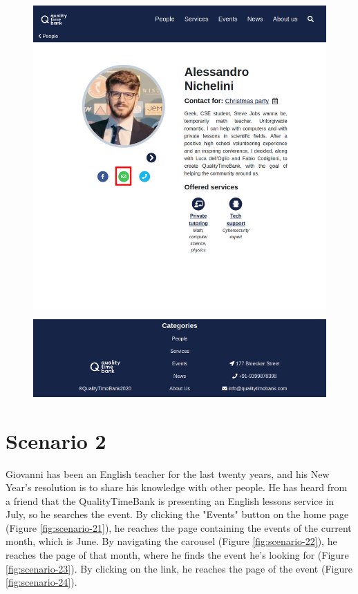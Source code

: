 \documentclass[a4paper, 11pt, parskip=half, headsepline]{scrreprt}
\begin{document}
\begin{figure}[H]
\begin{minipage}[t]{0.5\textwidth}
    	\includegraphics[width=1\linewidth, keepaspectratio]{scenarios/scenario-14}
    	\caption{}
    	\label{fig:scenario-14}
    \end{minipage}
\end{figure}

\section{Scenario 2}	

Giovanni has been an English teacher for the last twenty years, and his New Year's resolution is to share his knowledge with other people. He has heard from a friend that the QualityTimeBank is presenting an English lessons service in July, so he searches the event. By clicking the "Events" button on the home page (Figure \ref{fig:scenario-21}), he reaches the page containing the events of the current month, which is June. By navigating the carousel (Figure \ref{fig:scenario-22}), he reaches the page of that month, where he finds the event he's looking for (Figure \ref{fig:scenario-23}). By clicking on the link, he reaches the page of the event (Figure \ref{fig:scenario-24}).
\end{document}
